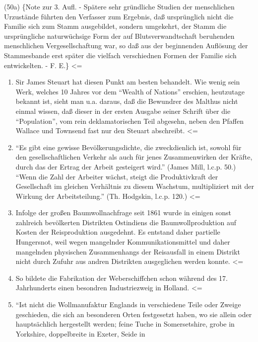 {(50a) \{Note zur 3. Aufl. - Spätere sehr gründliche Studien der
menschlichen Urzustände führten den Verfasser zum Ergebnis, daß
ursprünglich nicht die Familie sich zum Stamm ausgebildet, sondern
umgekehrt, der Stamm die ursprüngliche naturwüchsige Form der auf
Blutsverwandtschaft beruhenden menschlichen Vergesellschaftung war, so
daß aus der beginnenden Auflösung der Stammesbande erst später die
vielfach verschiednen Formen der Familie sich entwickelten. - F. E.\}
\textless{}=

\begin{enumerate}
\def\labelenumi{(\arabic{enumi})}
\setcounter{enumi}{50}
\item
  Sir James Steuart hat diesen Punkt am besten behandelt. Wie wenig sein
  Werk, welches 10 Jahres vor dem ``Wealth of Nations'' erschien,
  heutzutage bekannt ist, sieht man u.a. daraus, daß die Bewundrer des
  Malthus nicht einmal wissen, daß dieser in der ersten Ausgabe seiner
  Schrift über die ``Population'', vom rein deklamatorischen Teil
  abgesehn, neben den Pfaffen Wallace und Townsend fast nur den Steuart
  abschreibt. \textless{}=
\item
  ``Es gibt eine gewisse Bevölkerungsdichte, die zweckdienlich ist,
  sowohl für den gesellschaftlichen Verkehr als auch für jenes
  Zusammenwirken der Kräfte, durch das der Ertrag der Arbeit gesteigert
  wird.'' (James Mill, l.c.p. 50.) ``Wenn die Zahl der Arbeiter wächst,
  steigt die Produktivkraft der Gesellschaft im gleichen Verhältnis zu
  diesem Wachstum, multipliziert mit der Wirkung der Arbeitsteilung.''
  (Th. Hodgskin, l.c.p. 120.) \textless{}=
\item
  Infolge der großen Baumwollnachfrage seit 1861 wurde in einigen sonst
  zahlreich bevölkerten Distrikten Ostindiens die Baumwollproduktion auf
  Kosten der Reisproduktion ausgedehnt. Es entstand daher partielle
  Hungersnot, weil wegen mangelnder Kommunikationsmittel und daher
  mangelnden physischen Zusammenhangs der Reisausfall in einem Distrikt
  nicht durch Zufuhr aus andren Distrikten ausgeglichen werden konnte.
  \textless{}=
\item
  So bildete die Fabrikation der Weberschiffchen schon während des 17.
  Jahrhunderts einen besondren Industriezweig in Holland. \textless{}=
\item
  ``Ist nicht die Wollmanufaktur Englands in verschiedene Teile oder
  Zweige geschieden, die sich an besonderen Orten festgesetzt haben, wo
  sie allein oder hauptsächlich hergestellt werden; feine Tuche in
  Somersetshire, grobe in Yorkshire, doppelbreite in Exeter, Seide in

\end{enumerate}}
